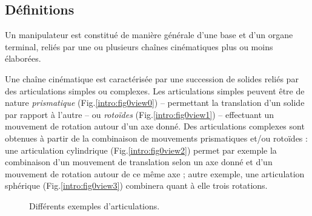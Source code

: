 \subsection{Définitions} \label{chap0-0-0}

Un manipulateur est constitué de manière générale d'une base et d'un organe 
terminal, reliés par une ou plusieurs chaînes cinématiques plus ou moins 
élaborées.

Une chaîne cinématique est caractérisée par une succession de solides reliés 
par des articulations simples ou complexes. Les articulations simples peuvent 
être de nature {\it prismatique} (Fig.\ref{intro:fig0view0}) -- permettant la 
translation d'un solide par rapport à l'autre -- ou {\it rotoïdes} 
(Fig.\ref{intro:fig0view1}) -- effectuant un mouvement de rotation autour d'un 
axe donné. Des articulations complexes sont obtenues à partir de la combinaison 
de mouvements prismatiques et/ou rotoïdes : une articulation cylindrique 
(Fig.\ref{intro:fig0view2}) permet par exemple la combinaison d'un mouvement de 
translation selon un axe donné et d'un mouvement de rotation autour de ce même 
axe ; autre exemple, une articulation sphérique (Fig.\ref{intro:fig0view3}) 
combinera quant à elle trois rotations.

\begin{figure}[!ht]
  \centering
\hfill
\hfill
\hfill
    \caption{\footnotesize{Différents exemples d'articulations.}}
\label{intro:fig0}
\end{figure}

